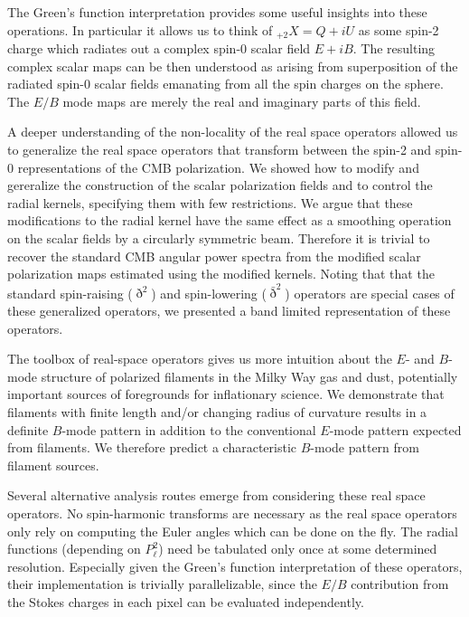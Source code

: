 The Green's function interpretation provides some useful insights into these operations. In particular it allows us to think of ${}_{+2}X=Q+iU$ as some spin-2 charge which radiates out a complex spin-0 scalar field $E+iB$. The resulting complex scalar maps can be then understood as arising from superposition of the radiated spin-0 scalar fields emanating from all the spin charges on the sphere.  The $E/B$ mode maps are merely the real and imaginary parts of this field.

A deeper understanding of the non-locality of the real space operators allowed us to generalize the real space operators that transform between the spin-2 and spin-0 representations of the CMB polarization. We showed how to modify and gereralize the construction of the scalar polarization fields and to control the radial kernels, specifying them with few restrictions.  We argue that these modifications to the radial kernel have the same effect as a smoothing operation on the scalar fields by a circularly symmetric beam.  Therefore it is trivial to recover the standard CMB angular power spectra from the modified scalar polarization maps estimated using the modified kernels.  Noting that that the standard spin-raising ($\eth^2$) and spin-lowering ($\bar{\eth}^2$) operators are special cases of these generalized operators, we presented a band limited representation of these operators. 

The toolbox of real-space operators gives us more intuition about the $E$- and $B$-mode structure of polarized filaments in the Milky Way gas and dust, potentially important sources of foregrounds for inflationary science. We demonstrate that filaments with finite length and/or changing radius of curvature results in a definite $B$-mode pattern in addition to the conventional $E$-mode pattern expected from filaments. We therefore predict a characteristic $B$-mode pattern from filament sources.


Several alternative analysis routes emerge from considering  these real space operators.  No spin-harmonic transforms are necessary as the real space operators only rely on computing the Euler angles which can be done on the fly.  The radial functions (depending on $P_{\ell}^{2}$) need be tabulated only once at some determined resolution.  Especially given the Green's function interpretation of these operators, their implementation is trivially parallelizable, since the $E/B$ contribution from the Stokes charges in each pixel can be evaluated independently.  

